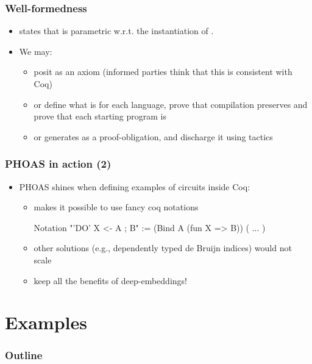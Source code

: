 \documentclass[9pt]{beamer}
\begin{document}
\begin{frame}[fragile]
  \frametitle{Well-formedness}

  \begin{itemize}
  \item   {} states that  is  parametric w.r.t. the instantiation of . 
  \item  We may:
    \begin{itemize}
    \item posit  as an axiom (informed
      parties think that this is consistent with Coq)
    \item or define what is  for each language, prove that compilation preserves  and prove that each starting program is  
    \item or generates  as a \alert{proof-obligation}, and discharge it using tactics
    \end{itemize}
  \end{itemize}
\end{frame}
\begin{frame}[fragile]
  \frametitle{PHOAS in action (2)}

  \begin{itemize}
  \item<1-> PHOAS shines when defining examples of circuits inside Coq: 
    \begin{itemize}
    \item makes it possible to use fancy coq notations 
\begin{coq}
Notation "'DO' X <- A ; B" := (Bind A (fun X => B)) ( ... )      
\end{coq}
\item other solutions (e.g., dependently typed de Bruijn indices) would not scale
\item keep all the benefits of deep-embeddings!
\end{itemize}
\end{itemize}
\end{frame}

\section{Examples}

\begin{frame}
  \frametitle{Outline}       
  \tableofcontents [currentsection] 
\end{frame}
\end{document}
